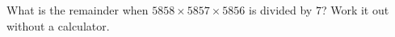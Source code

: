 What is the remainder when $5858\times5857\times5856$ is divided by $7$? Work it out without a calculator.
